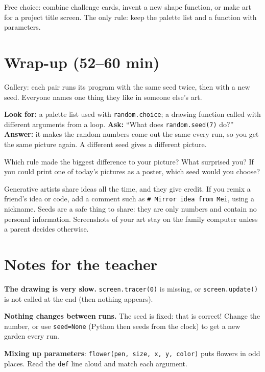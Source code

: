 \begin{freebuild}
Free choice: combine challenge cards, invent a new shape function, or make art for a project title
screen. The only rule: keep the palette list and a function with parameters.
\end{freebuild}

\section{Wrap-up (52--60 min)}
Gallery: each pair runs its program with the same seed twice, then with a new seed. Everyone names
one thing they like in someone else's art.

\begin{formativecheck}
\textbf{Look for:} a palette list used with \texttt{random.choice}; a drawing function called with
different arguments from a loop.
\textbf{Ask:} \enquote{What does \texttt{random.seed(7)} do?}
\textbf{Answer:} it makes the random numbers come out the same every run, so you get the same picture
again. A different seed gives a different picture.
\end{formativecheck}

\begin{reflection}
Which rule made the biggest difference to your picture? What surprised you? If you could print one of
today's pictures as a poster, which seed would you choose?
\end{reflection}

\begin{safety}
Generative artists share ideas all the time, and they give credit. If you remix a friend's idea or
code, add a comment such as \texttt{\# Mirror idea from Mei}, using a nickname. Seeds are a safe thing to
share: they are only numbers and contain no personal information. Screenshots of your art stay on the
family computer unless a parent decides otherwise.
\end{safety}

\section{Notes for the teacher}
\begin{commonmistakes}
  \item \textbf{The drawing is very slow.} \texttt{screen.tracer(0)} is missing, or \texttt{screen.update()} is not called at the end (then nothing appears).
  \item \textbf{Nothing changes between runs.} The seed is fixed: that is correct! Change the number, or use \texttt{seed=None} (Python then seeds from the clock) to get a new garden every run.
  \item \textbf{Mixing up parameters}: \texttt{flower(pen, size, x, y, color)} puts flowers in odd places. Read the \texttt{def} line aloud and match each argument.
\end{commonmistakes}

